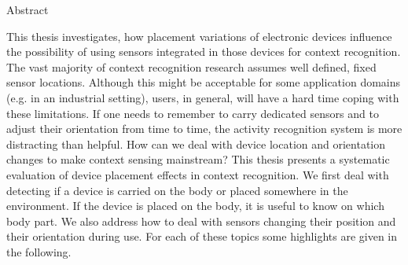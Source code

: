 \begin{flushleft}
\medskip
\Large\textrm{Abstract}
\medskip
\end{flushleft}This thesis investigates, how placement variations of electronic devices influence the possibility of using sensors integrated in those devices for context recognition.
The vast majority of context recognition research assumes well defined, fixed sensor locations.
Although this might be acceptable for some application domains (e.g. in an industrial setting), users, in general, will have a hard time coping with these limitations. If one needs to remember to carry dedicated sensors and to adjust their orientation from time to time, the activity recognition system is more distracting than helpful. How can we deal with device location and orientation changes to make context sensing mainstream?
This thesis presents a systematic evaluation of device placement effects in context recognition.
We first deal with detecting if a device is carried on the body
or placed somewhere in the environment. If the device is placed on the body, it is useful to know on which body part.
We also address how to deal with sensors changing their position and their orientation
during use. For each of these topics some highlights are given in the following.


